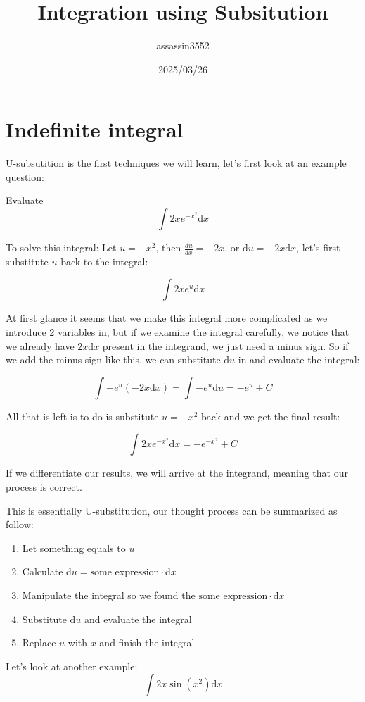 \documentclass{article}
\title{Integration using Subsitution}
\author{assassin3552}
\date{2025/03/26}
\numberwithin{equation}{section}
\begin{document}
\maketitle

\section{Indefinite integral}
U-subsutition is the first techniques we will learn, let's first look at an example question:

Evaluate
\[
\int 2x e^{-x^2} \mathrm{d}x
\]

To solve this integral: Let $u = -x^2$, then $\displaystyle \frac{d{u}}{d{x}} = -2x$, or $\mathrm{d}u = -2x \mathrm{d}x$, let's first substitute $u$ back to the integral:

\[
\int 2x e^u \mathrm{d}x
\]

At first glance it seems that we make this integral more complicated as we introduce 2 variables in,
but if we examine the integral carefully, we notice that we already have $2x\mathrm{d}x$ present in the integrand, we just need a minus sign.
So if we add the minus sign like this, we can substitute $\mathrm{d}u$ in and evaluate the integral:

\[
\int - e^u(-2x \mathrm{d}x) = \int -e^u \mathrm{d}u = -e^u+C
\]

All that is left is to do is substitute $u=-x^2$ back and we get the final result:

\[
\int 2xe^{-x^2} \mathrm{d}x = -e^{-x^2}+C
\]

If we differentiate our results, we will arrive at the integrand, meaning that our process is correct.

This is essentially U-substitution, our thought process can be summarized as follow:
\begin{enumerate}
    \item Let something equals to $u$
    \item Calculate $\mathrm{d}u = \text{some expression} \cdot \mathrm{d}x$
    \item Manipulate the integral so we found the $\text{some expression} \cdot \mathrm{d}x$
    \item Substitute $\mathrm{d}u$ and evaluate the integral
    \item Replace $u$ with $x$ and finish the integral
\end{enumerate}

\newpage
Let's look at another example:
\[
\int 2x \sin(x^2) \mathrm{d}x
\]
\end{document}
